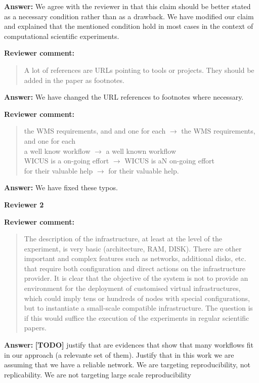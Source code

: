 \documentclass{letter}
\newenvironment{review}%
{\textbf{Reviewer comment:}\begin{quote}}%
{\end{quote}}%
\newcommand{\todo}[1]{%
      \color{red}\textbf{[TODO]} #1\color{black}}
\newcommand{\answer}[1]{%
      \textbf{Answer:} #1}
\begin{document}
\begin{letter}{}
\answer{We agree with the reviewer in that this claim should be better stated as a necessary condition rather than as a drawback. We have modified our claim and explained that the mentioned condition hold in most cases in the context of computational scientific experiments. }


\begin{review}
A lot of references are URLs pointing to tools or projects. They should be added in the paper as footnotes.
\end{review}

\answer{We have changed the URL references to footnotes where necessary.}


\begin{review}
the WMS requirements, and and one for each $\rightarrow$ the WMS requirements, and one for each \\
a well know workflow $\rightarrow$ a well known workflow \\
WICUS is a on-going effort $\rightarrow$ WICUS is aN on-going effort \\
for their valuable help $\rightarrow$ for their valuable help.
\end{review}

\answer{We have fixed these typos.}



\newpage

%
%
\textbf{Reviewer 2}


\begin{review}
The description of the infrastructure, at least at the level of the experiment, is very basic (architecture, RAM, DISK). There are other important and complex features such as networks, additional disks, etc. that require both configuration and direct actions on the infrastructure provider. It is clear that the objective of the system is not to provide an environment for the deployment of customised virtual infrastructures, which could imply tens or hundreds of nodes with special configurations, but to instantiate a small-scale compatible infrastructure. The question is if this would suffice the execution of the experiments in regular scientific papers.
\end{review}

\answer{\todo{justify that are evidences that show that many workflows fit in our approach (a relevante set of them). Justify that in this work we are assuming that we have a reliable network. We are targeting reproducibility, not replicability. We are not targeting large scale reproducibility}}


\end{letter}
\end{document}
